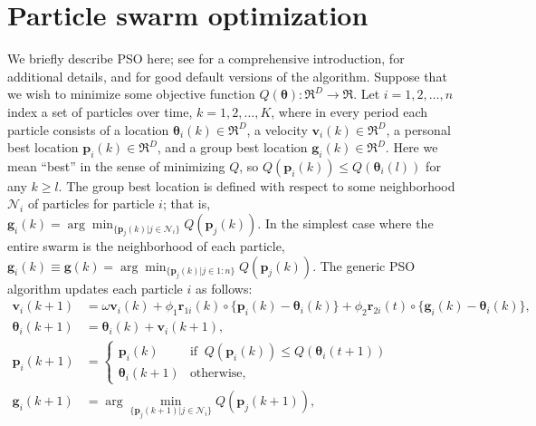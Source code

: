 \documentclass[cmbright]{staauth}
\begin{document}
\section{Particle swarm optimization}\label{sec:pso}
We briefly describe PSO here; see \cite{blum2008swarm} for a comprehensive introduction, \cite{clerc2010particle} for additional details, and \cite{clerc2011spso} for good default versions of the algorithm. Suppose that we wish to minimize some objective function $Q(\bm{\theta}):\Re^D\to\Re$. Let $i=1,2,\dots,n$ index a set of particles over time, $k=1,2,\dots,K$, where in every period each particle consists of a location $\bm{\theta}_i(k)\in \Re^D$, a velocity $\bm{v}_i(k) \in \Re^D$, a personal best location $\bm{p}_i(k)\in\Re^D$, and a group best location $\bm{g}_i(k)\in\Re^D$. Here we mean ``best'' in the sense of minimizing $Q$, so $Q(\bm{p}_i(k)) \leq Q(\bm{\theta}_i(l))$ for any $k\geq l$. The group best location is defined with respect to some neighborhood $\mathcal{N}_i$ of particles for particle $i$; that is, $\bm{g}_i(k) = \arg\min_{\{\bm{p}_j(k)|j\in\mathcal{N}_i\}}Q(\bm{p}_j(k))$. In the simplest case where the entire swarm is the neighborhood of each particle, $\bm{g}_i(k)\equiv \bm{g}(k) = \arg\min_{\{\bm{p}_j(k)|j\in 1:n\}}Q(\bm{p}_j(k))$. The generic PSO algorithm updates each particle $i$ as follows:
\begin{align}\label{eq:pso}
\bm{v}_i(k+1) &= \omega \bm{v}_i(k) + \phi_1 \bm{r}_{1i}(k)\circ\{\bm{p}_i(k) - \bm{\theta}_i(k)\} + \phi_2 \bm{r}_{2i}(t)\circ\{\bm{g}_i(k) - \bm{\theta}_i(k)\},\nonumber\\
\bm{\theta}_i(k+1) &= \bm{\theta}_i(k) + \bm{v}_i(k+1),\nonumber\\
\bm{p}_i(k+1) &= \begin{cases} \bm{p}_i(k)   & \mbox{if }\  Q(\bm{p}_i(k)) \le Q(\bm{\theta}_i(t + 1))\\
                               \bm{\theta}_i(k+1) & \mbox{otherwise},
\end{cases}\nonumber\\
\bm{g}_i(k+1) &= \arg\min_{\{\bm{p}_j(k+1)|j\in\mathcal{N}_i\}}Q(\bm{p}_j(k+1)),
\end{align}
\end{document}
